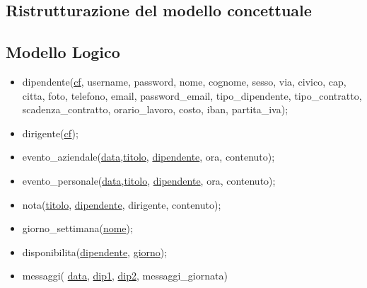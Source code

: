 \documentclass[paper=a4, fontsize=11pt]{scrartcl} %
\numberwithin{equation}{section} %
\numberwithin{figure}{section} %
\numberwithin{table}{section} %
\begin{document}
\newpage
\subsection*{Ristrutturazione del modello concettuale}


    \begin{figure}[htbp]
        \centering
        \qquad\qquad
      \end{figure}

\subsection*{Modello Logico}
\begin{itemize}
  \item dipendente(\underline{cf}, username, password, nome, cognome, sesso, via, civico, cap, citta, foto, telefono,
      email, password\_email, tipo\_dipendente, tipo\_contratto, scadenza\_contratto, orario\_lavoro, costo, iban, partita\_iva);
  \item dirigente(\underline{cf});
  \item evento\_aziendale(\underline{data},\underline{titolo}, \underline{dipendente}, ora, contenuto);
  \item evento\_personale(\underline{data},\underline{titolo}, \underline{dipendente}, ora, contenuto);
  \item nota(\underline{titolo}, \underline{dipendente}, dirigente, contenuto);
  \item giorno\_settimana(\underline{nome});
  \item disponibilita(\underline{dipendente}, \underline{giorno});
  \item messaggi( \underline{data}, \underline{dip1}, \underline{dip2}, messaggi\_giornata)

\end{itemize}
\end{document}
